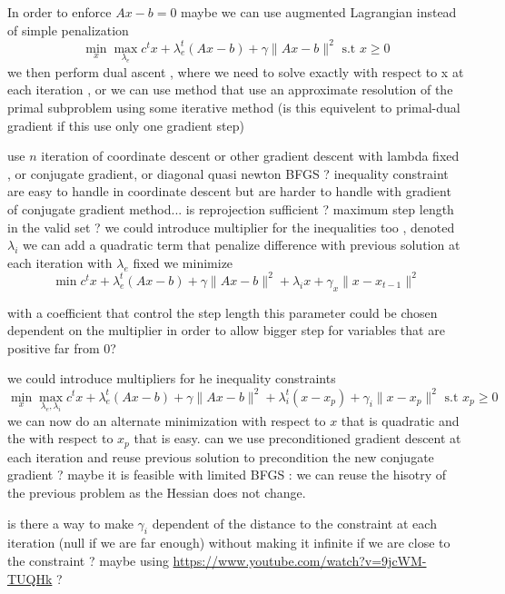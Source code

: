\documentclass[11pt]{article}
\begin{document}
In order to enforce $Ax-b=0$ maybe we can use augmented Lagrangian instead of simple penalization 
\begin{equation}
\mathop{min}_x \mathop{max}_{\lambda_e} c^tx +\lambda_e^t(Ax-b)+ \gamma\|Ax-b\|^2\text{ s.t }x\geq 0
\end{equation}
we then perform dual ascent , where we need to solve exactly with respect to x at each iteration , or we can use method that use an approximate resolution of the primal subproblem using some iterative method (is this equivelent to primal-dual gradient if this use only one gradient step)

use $n$ iteration of coordinate descent or other gradient descent with lambda fixed , or conjugate gradient, or diagonal quasi newton BFGS ?
inequality constraint are easy to handle in coordinate descent but are harder to handle with gradient of conjugate gradient method...
is reprojection sufficient ? maximum step length in the valid set ? 
we could introduce multiplier for the inequalities too , denoted $ \lambda_i$
we can add a quadratic term that penalize difference with previous solution 
at each iteration with $\lambda_e$ fixed we minimize
\begin{equation}
\mathop{min}  c^tx +\lambda_e^t(Ax-b)+ \gamma\|Ax-b\|^2+ \lambda_i x + \gamma_x\|x-x_{t-1}\|^2
\end{equation}

with a coefficient that control the step length this parameter could be chosen dependent on the multiplier in order to allow bigger step for variables that are positive far from 0? 

we could introduce multipliers for he inequality constraints
\begin{equation}
\mathop{min}_x \mathop{max}_{\lambda_e,\lambda_i} c^tx +\lambda_e^t(Ax-b)+ \gamma\|Ax-b\|^2+\lambda_i^t (x-x_p)+\gamma_i\|x-x_p\|^2 \text{ s.t } x_p\geq 0
\end{equation}
we can now do an alternate minimization with respect to $x$ that is quadratic and the with respect to $x_p$ that is easy.
can we use preconditioned gradient descent at each iteration and reuse previous solution to precondition the new conjugate gradient ?
maybe it is feasible with limited BFGS : we can reuse the hisotry of the previous problem as the Hessian does not change.
 
is there a way to make $\gamma_i$ dependent of the distance to the constraint at each iteration (null if we are far enough) without making it infinite if we are close to the constraint ? 
maybe using \url{https://www.youtube.com/watch?v=9jcWM-TUQHk} ? 
\end{document}
